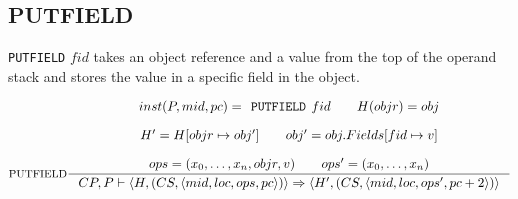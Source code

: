 \subsection{PUTFIELD}
\texttt{PUTFIELD} $fid$ takes an object reference and a value from the top of the operand stack and stores the value in a specific field in the object.

$$\inference[PUTFIELD]{
inst(P,mid, pc) = \texttt{PUTFIELD } fid \semsp
H(objr) = obj \semnl \\
H' = H[objr \mapsto obj'] \semsp 
obj' = obj.Fields[fid \mapsto v] \semnl\\
ops = (x_0, \ldots, x_n, objr, v) \semsp
ops' = (x_0, \ldots, x_{n})}
{CP, P \vdash \langle H, (CS, \langle mid, loc, ops, pc \rangle )\rangle \Rightarrow \langle H', (CS, \langle mid, loc, ops', pc + 2 \rangle )\rangle}$$